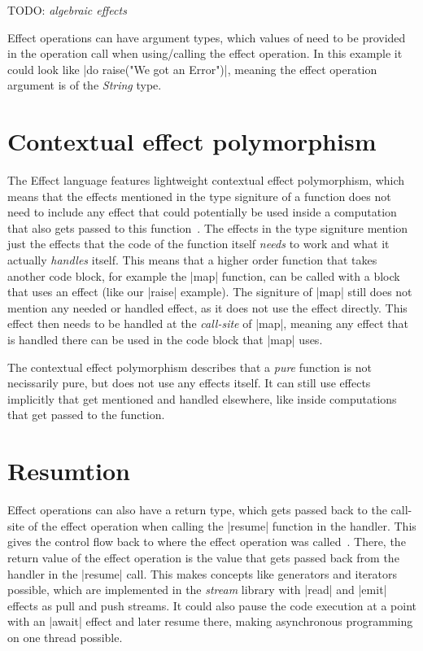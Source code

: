 TODO: \textit{algebraic effects}

Effect operations can have argument types, which values of need to be provided in the operation call when using/calling the effect operation. In this example it could look like |do raise("We got an Error")|, meaning the effect operation argument is of the \textit{String} type.

\section{Contextual effect polymorphism}

The Effect language features lightweight contextual effect polymorphism, which means that the effects mentioned in the type signiture of a function does not need to include any effect that could potentially be used inside a computation that also gets passed to this function~\cite{brachthauser2020effects}. The effects in the type signiture mention just the effects that the code of the function itself \textit{needs} to work and what it actually \textit{handles} itself. This means that a higher order function that takes another code block, for example the |map| function, can be called with a block that uses an effect (like our |raise| example). The signiture of |map| still does not mention any needed or handled effect, as it does not use the effect directly. This effect then needs to be handled at the \textit{call-site} of |map|, meaning any effect that is handled there can be used in the code block that |map| uses.

The contextual effect polymorphism describes that a \textit{pure} function is not necissarily pure, but does not use any effects itself. It can still use effects implicitly that get mentioned and handled elsewhere, like inside computations that get passed to the function.

\section{Resumtion}

Effect operations can also have a return type, which gets passed back to the call-site of the effect operation when calling the |resume| function in the handler. This gives the control flow back to where the effect operation was called~\cite{brachthauser2020effects}. There, the return value of the effect operation is the value that gets passed back from the handler in the |resume| call. This makes concepts like generators and iterators possible, which are implemented in the \textit{stream} library with |read| and |emit| effects as pull and push streams. It could also pause the code execution at a point with an |await| effect and later resume there, making asynchronous programming on one thread possible.

